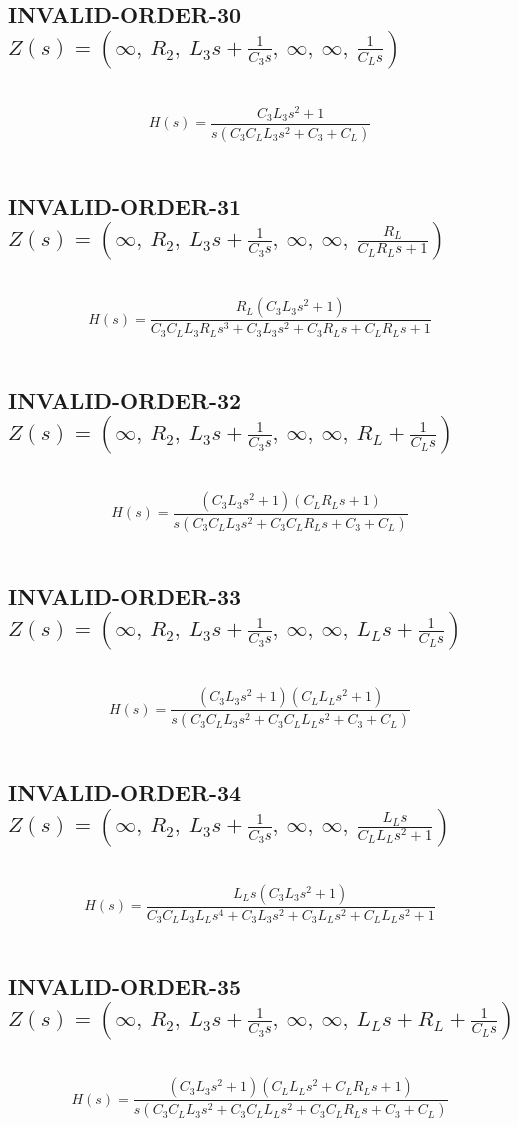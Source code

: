 \documentclass{article}
\begin{document}
\subsection{INVALID-ORDER-30 $Z(s) = \left( \infty, \  R_{2}, \  L_{3} s + \frac{1}{C_{3} s}, \  \infty, \  \infty, \  \frac{1}{C_{L} s}\right)$ } \ 
\textbf{\[H(s) = \frac{C_{3} L_{3} s^{2} + 1}{s \left(C_{3} C_{L} L_{3} s^{2} + C_{3} + C_{L}\right)}\] } \ 
\subsection{INVALID-ORDER-31 $Z(s) = \left( \infty, \  R_{2}, \  L_{3} s + \frac{1}{C_{3} s}, \  \infty, \  \infty, \  \frac{R_{L}}{C_{L} R_{L} s + 1}\right)$ } \ 
\textbf{\[H(s) = \frac{R_{L} \left(C_{3} L_{3} s^{2} + 1\right)}{C_{3} C_{L} L_{3} R_{L} s^{3} + C_{3} L_{3} s^{2} + C_{3} R_{L} s + C_{L} R_{L} s + 1}\] } \ 
\subsection{INVALID-ORDER-32 $Z(s) = \left( \infty, \  R_{2}, \  L_{3} s + \frac{1}{C_{3} s}, \  \infty, \  \infty, \  R_{L} + \frac{1}{C_{L} s}\right)$ } \ 
\textbf{\[H(s) = \frac{\left(C_{3} L_{3} s^{2} + 1\right) \left(C_{L} R_{L} s + 1\right)}{s \left(C_{3} C_{L} L_{3} s^{2} + C_{3} C_{L} R_{L} s + C_{3} + C_{L}\right)}\] } \ 
\subsection{INVALID-ORDER-33 $Z(s) = \left( \infty, \  R_{2}, \  L_{3} s + \frac{1}{C_{3} s}, \  \infty, \  \infty, \  L_{L} s + \frac{1}{C_{L} s}\right)$ } \ 
\textbf{\[H(s) = \frac{\left(C_{3} L_{3} s^{2} + 1\right) \left(C_{L} L_{L} s^{2} + 1\right)}{s \left(C_{3} C_{L} L_{3} s^{2} + C_{3} C_{L} L_{L} s^{2} + C_{3} + C_{L}\right)}\] } \ 
\subsection{INVALID-ORDER-34 $Z(s) = \left( \infty, \  R_{2}, \  L_{3} s + \frac{1}{C_{3} s}, \  \infty, \  \infty, \  \frac{L_{L} s}{C_{L} L_{L} s^{2} + 1}\right)$ } \ 
\textbf{\[H(s) = \frac{L_{L} s \left(C_{3} L_{3} s^{2} + 1\right)}{C_{3} C_{L} L_{3} L_{L} s^{4} + C_{3} L_{3} s^{2} + C_{3} L_{L} s^{2} + C_{L} L_{L} s^{2} + 1}\] } \ 
\subsection{INVALID-ORDER-35 $Z(s) = \left( \infty, \  R_{2}, \  L_{3} s + \frac{1}{C_{3} s}, \  \infty, \  \infty, \  L_{L} s + R_{L} + \frac{1}{C_{L} s}\right)$ } \ 
\textbf{\[H(s) = \frac{\left(C_{3} L_{3} s^{2} + 1\right) \left(C_{L} L_{L} s^{2} + C_{L} R_{L} s + 1\right)}{s \left(C_{3} C_{L} L_{3} s^{2} + C_{3} C_{L} L_{L} s^{2} + C_{3} C_{L} R_{L} s + C_{3} + C_{L}\right)}\] } \ 
\end{document}
